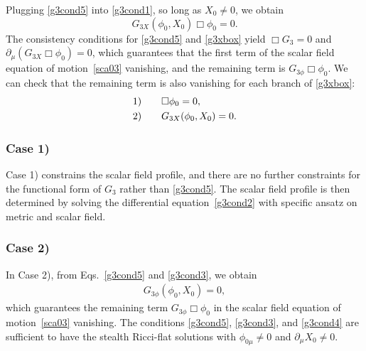 \documentclass[prd,amsmath,amssymb,floatfix,superscriptaddress,notitlepage,nofootinbib,preprintnumbers]{revtex4-1}
\newcommand{\be}{\begin{equation}}
\newcommand{\ee}{\end{equation}}
\begin{document}
Plugging \eqref{g3cond5} into \eqref{g3cond1}, so long as $X_0\neq 0$, we obtain 
\be \label{g3xbox} G_{3X}(\phi_0,X_0)\Box\phi_0=0. \ee
The consistency conditions for \eqref{g3cond5} and \eqref{g3xbox} yield 
$\Box G_3 = 0$ and $\partial_\mu(G_{3X}\Box\phi_0)=0$, 
which guarantees that the first term of the scalar field equation of motion~\eqref{sca03} vanishing,
and the remaining term is $G_{3\phi}\Box\phi_0$.
We can check that the remaining term is also vanishing for each branch of \eqref{g3xbox}:
\begin{align}
\label{g3cond2}
&{\rm 1)}\qquad \Box\phi_0=0, \\
\label{g3cond3}
&{\rm 2)}\qquad  G_{3X}(\phi_0,X_0)=0.
\end{align}


\subsubsection{Case 1)}
\label{sec411}

Case 1) constrains the scalar field profile, 
and there are no further constraints for the functional form of $G_3$ rather than \eqref{g3cond5}. 
The scalar field profile is then determined by solving the differential equation~\eqref{g3cond2}
with specific ansatz on metric and scalar field.


\subsubsection{Case 2)}
\label{sec412}


In  Case 2), 
from Eqs.~\eqref{g3cond5} and \eqref{g3cond3}, we obtain
\begin{align}
\label{g3cond4}
G_{3\phi}(\phi_0,X_0)=0,
\end{align}
which guarantees the remaining term $G_{3\phi}\Box\phi_0$ 
in the scalar field equation of motion~\eqref{sca03} vanishing.
The conditions \eqref{g3cond5}, \eqref{g3cond3}, and \eqref{g3cond4}
are sufficient to have the stealth Ricci-flat solutions with $\phi_{0\mu}\neq 0$ and $\partial_\mu X_0\neq 0$. 
\end{document}

